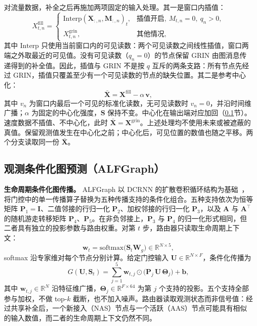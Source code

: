 对流量数据，补全之后再施加两项固定的输入处理。其一是窗口内插值：
\begin{equation}\label{eq:3}
X^{\mathrm{fill}}_{t,n}=
\begin{cases}
\mathrm{Interp}(\mathbf{X}_{:,n},\mathbf{M}_{:,n})_t, & \text{插值开启},\ M_{t,n}=0,\ q_n>0,\\
X^{\mathrm{grin}}_{t,n}, & \text{其他情况},
\end{cases}
\end{equation}
其中 $\mathrm{Interp}$ 只使用当前窗口内的可见读数：两个可见读数之间线性插值，窗口两端之外取最近的可见值。没有可见读数（$q_n=0$）的节点保留 GRIN 由图消息传递得到的补全值。因此，插值与 GRIN 不是按 $q$ 互斥的两条支路：所有节点先经过 GRIN，插值只覆盖至少有一个可见读数的节点的缺失位置。其二是参考中心化：
\begin{equation}\label{eq:4}
\bar{\mathbf{X}}=\mathbf{X}^{\mathrm{fill}}-\alpha\,\mathbf{v},
\end{equation}
其中 $v_n$ 为窗口内最后一个可见的标准化读数，无可见读数时 $v_n=0$，并沿时间维广播；$\alpha$ 为固定的中心化强度，$\mathbf{S}$ 保持不变。中心化在输出端对应加回（\ref{sec:3_4}节）。速度数据不插值、不中心化，此时 $\bar{\mathbf{X}}=\mathbf{X}^{\mathrm{grin}}$。上述处理均不使用未来或被遮蔽的真值。保留观测值发生在中心化之前；中心化后，可见位置的数值也随之平移。两个分支读取同一份 $\bar{\mathbf{X}}$。

\subsection{观测条件化图预测（ALFGraph）}\label{sec:3_4}

\textbf{生命周期条件化图传播。} ALFGraph 以 DCRNN 的扩散卷积循环结构为基础~\citep{li2018diffusion}，将门控中的单一传播算子替换为五种传播支持的条件化组合。五种支持依次为恒等矩阵 $\mathbf{P}_1=\mathbf{I}$、二值邻接的行归一化 $\mathbf{P}_2$、加权邻接的行归一化 $\mathbf{P}_3$，以及 $\mathbf{A}$ 与 $\mathbf{A}^{\top}$ 的随机游走转移矩阵 $\mathbf{P}_4$、$\mathbf{P}_5$。在非负邻接上，$\mathbf{P}_3$ 与 $\mathbf{P}_4$ 的归一化形式相同，但二者具有独立的投影参数与路由权重。对第 $t$ 步，路由器只读取生命周期上下文：
\begin{equation}\label{eq:5}
\mathbf{w}_t=\mathrm{softmax}\big(\mathbf{S}_t\mathbf{W}_g\big)\in\mathbb{R}^{N\times5},
\end{equation}
softmax 沿专家维对每个节点分别计算。给定门控输入 $\mathbf{U}\in\mathbb{R}^{N\times F}$，条件化传播为
\begin{equation}\label{eq:6}
G(\mathbf{U},\mathbf{S}_t)=\sum_{j=1}^{5}\mathbf{w}_{t,j}\odot\big(\mathbf{P}_j\,\mathbf{U}\,\boldsymbol{\Theta}_j\big)+\mathbf{b},
\end{equation}
其中 $\mathbf{w}_{t,j}\in\mathbb{R}^{N}$ 沿特征维广播，$\boldsymbol{\Theta}_j\in\mathbb{R}^{F\times64}$ 为第 $j$ 个支持的投影。五个支持全部参与加权，不做 top-$k$ 截断，也不加入噪声。路由器读取观测状态而非信号值：经过共享补全后，一个新接入（NAS）节点与一个活跃（AAS）节点可能具有相似的输入数值，而二者的生命周期上下文仍然不同。

